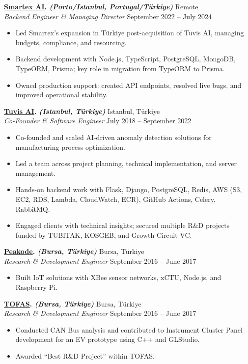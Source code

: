 \documentclass[10pt,a4paper]{extarticle}
\begin{document}
\textbf{\href{https://smartex.ai}{Smartex AI}. \textit{(Porto/Istanbul, Portugal/Türkiye)}} \hfill Remote\\
\textit{Backend Engineer & Managing Director} \hfill September 2022 --  July 2024
\begin{itemize}[leftmargin=*,noitemsep,topsep=0pt]
    \item Led Smartex’s expansion in Türkiye post-acquisition of Tuvis AI, managing budgets, compliance, and resourcing.
    \item Backend development with Node.js, TypeScript, PostgreSQL, MongoDB, TypeORM, Prisma; key role in migration from TypeORM to Prisma.
    \item Owned production support: created API endpoints, resolved live bugs, and improved operational stability.
\end{itemize}


\textbf{\href{https://www.tuvisai.com}{Tuvis AI}. \textit{(Istanbul, Türkiye)}} \hfill Istanbul, Türkiye\\
\textit{Co-Founder \& Software Engineer} \hfill July 2018 -- September 2022
\begin{itemize}[leftmargin=*,noitemsep,topsep=0pt]
    \item Co-founded and scaled AI-driven anomaly detection solutions for manufacturing process optimization.
    \item Led a team across project planning, technical implementation, and server management.
    \item Hands-on backend work with Flask, Django, PostgreSQL, Redis, AWS (S3, EC2, RDS, Lambda, CloudWatch, ECR), GitHub Actions, Celery, RabbitMQ.
    \item Engaged clients with technical insights; secured multiple R\&D projects funded by TUBITAK, KOSGEB, and Growth Circuit VC.
\end{itemize}

\textbf{\href{https://www.peakode.com}{Peakode}. \textit{(Bursa, Türkiye)}} \hfill Bursa, Türkiye\\
\textit{Research \& Development Engineer} \hfill September 2016 -- June 2017
\begin{itemize}[leftmargin=*,noitemsep,topsep=0pt]
    \item Built IoT solutions with XBee sensor networks, xCTU, Node.js, and Raspberry Pi.
\end{itemize}

\textbf{\href{https://www.tofas.com.tr}{TOFAS}. \textit{(Bursa, Türkiye)}} \hfill Bursa, Türkiye\\
\textit{Research \& Development Engineer} \hfill September 2016 -- June 2017
\begin{itemize}[leftmargin=*,noitemsep,topsep=0pt]
    \item Conducted CAN Bus analysis and contributed to Instrument Cluster Panel development for an EV prototype using C++ and GLStudio.
    \item Awarded ``Best R\&D Project'' within TOFAS.
\end{itemize}
\end{document}

